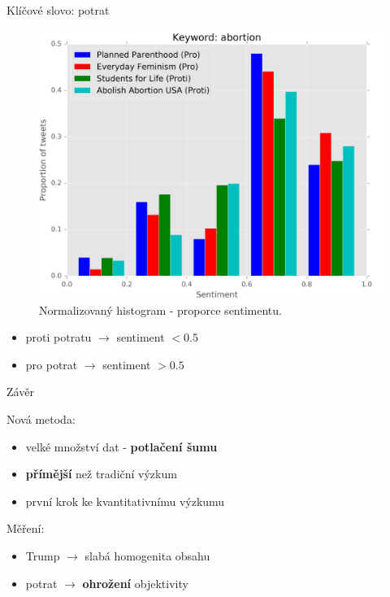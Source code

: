 \documentclass[notheorems,12pt]{beamer}
\begin{document}
\begin{frame}{Klíčové slovo: potrat}
    \begin{figure}
        \centering
        \includegraphics[scale=0.37]{./Pics/abortion-normed.png}
        \vspace{-0.2cm}
        \caption*{Normalizovaný histogram - proporce sentimentu.}
    \end{figure}
    \vspace{-0.4cm}
	\begin{itemize}
		\item proti potratu $\rightarrow$ sentiment $< 0.5$
        \item pro potrat $\rightarrow$ sentiment $> 0.5$
	\end{itemize}
\end{frame}
\begin{frame}{Závěr}
    \begin{block}{Nová metoda:}
        \begin{itemize}
            \item velké množství dat - \textbf{potlačení šumu}
            \item \textbf{přímější} než tradiční výzkum
            \item první krok ke kvantitativnímu výzkumu
        \end{itemize}
    \end{block}

    \begin{block}{Měření:}
    	\begin{itemize}
            \item Trump $\rightarrow$ slabá homogenita obsahu
            \item potrat $\rightarrow$ \textbf{ohrožení} objektivity
    	\end{itemize}
    \end{block}
\end{frame}
\end{document}
